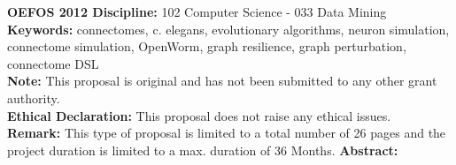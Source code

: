 \documentclass[a4paper,11pt]{article}
\begin{document}
%
%
{\bf OEFOS 2012 Discipline:} 102 Computer Science - 033  Data Mining 
\\[0,2cm]
{\bf Keywords:} connectomes, c. elegans, evolutionary algorithms, neuron simulation, connectome simulation, OpenWorm, graph resilience, graph perturbation, connectome DSL
\\[0,2cm]
{\bf Note:} This proposal is original and has not been submitted to any other grant authority.
\\[0,2cm]
{\bf Ethical Declaration:} This proposal does not raise any ethical issues.
\\[0,2cm]
{\bf Remark:} This type of proposal is limited to a total number of 26 pages and the project duration is limited to a max. duration of 36 Months.
\newpage
%
%
{\bf Abstract:}
\\[0,2cm]
\end{document}

